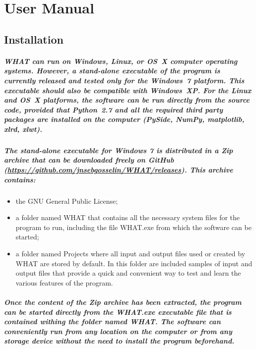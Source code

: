 \documentclass[10pt, letterpaper, fleqn]{report}
\begin{document}
\tableofcontents

\listoffigures

\chapter{User Manual}


\section{Installation}\label{sec:intallation}

\paragraph{WHAT can run on Windows, Linux, or OS X computer operating systems. However, a stand-alone executable of the program is currently released and tested only for the Windows 7 platform. This executable should also be compatible with Windows XP. For the Linux and OS X platforms, the software can be run directly from the source code, provided that Python 2.7 and all the required third party packages are installed on the computer (PySide, NumPy, matplotlib, xlrd, xlwt).}
\paragraph{The stand-alone executable for Windows 7 is distributed in a Zip archive that can be downloaded freely on GitHub (\url{https://github.com/jnsebgosselin/WHAT/releases}). This archive contains:}
\begin{itemize}
\item{the GNU General Public License;}
\item{a folder named WHAT that contains all the necessary system files for the program to run, including the file WHAT.exe from which the software can be started;}
\item{a folder named Projects where all input and output files used or created by WHAT are stored by default. In this folder are included samples of input and output files that provide a quick and convenient way to test and learn the various features of the program.}
\end{itemize}
\paragraph{Once the content of the Zip archive has been extracted, the program can be started directly from the WHAT.exe executable file that is contained withing the folder named WHAT. The software can conveniently run from any location on the computer or from any storage device without the need to install the program beforehand.}
\end{document}
